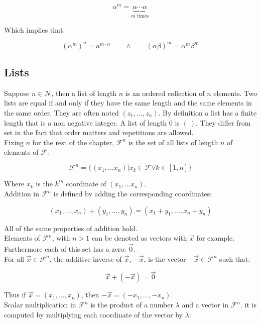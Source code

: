   $$\alpha^m = \underbrace{\alpha\cdots\alpha}_{m\text{ times}}$$

  Which implies that:

  $$(\alpha^m)^n = a^{m\cdot n}\qquad\land\qquad(\alpha\beta)^m = \alpha^m\beta^m$$

  \subsection{Lists}
  Suppose $n\in\mathcal{N}$, then a list of length $n$ is an ordered collection of $n$ elements.
  Two lists are equal if and only if they have the same length and the same elements in the same order.
  They are often noted $(z_1, \dots, z_n)$.
  By definition a list has a finite length that is a non negative integer.
  A list of length $0$ is $(\ )$.
  They differ from set in the fact that order matters and repetitions are allowed.\\

  Fixing $n$ for the rest of the chapter, $\mathcal{F}^n$ is the set of all lists of length $n$ of elements of $\mathcal{F}$:

  $$\mathcal{F}^n = \{(x_1, \dots x_n) | x_k\in\mathcal{F}\forall k \in [1,n]\}$$

  Where $x_k$ is the $k^{th}$ coordinate of $(x_1, \dots x_n)$.\\

  Addition in $\mathcal{F}^n$ is defined by adding the corresponding coordinates:

  $$(x_1,\dots, x_n) + (y_1, \dots, y_n) = (x_1 + y_1, \dots, x_n+y_n)$$

  All of the same properties of addition hold.\\

  Elements of $\mathcal{F}^n$, with $n > 1$ can be denoted as vectors with $\vec{x}$ for example.
  Furthermore each of this set has a zero: $\vec{0}$.\\

  For all $\vec{x}\in\mathcal{F}^n$, the additive inverse of $\vec{x}$, $-\vec{x}$, is the vector $-\vec{x}\in\mathcal{F}^n$ such that:

  $$\vec{x} + (-\vec{x}) = \vec{0}$$

  Thus if $\vec{x} = (x_1, \dots, x_n)$, then $-\vec{x} = (-x_1, \dots, -x_n)$.\\

  Scalar multiplication in $\mathcal{F}^n$ is the product of a number $\lambda$ and a vector in $\mathcal{F}^n$.
  it is computed by multiplying each coordinate of the vector by $\lambda$:

